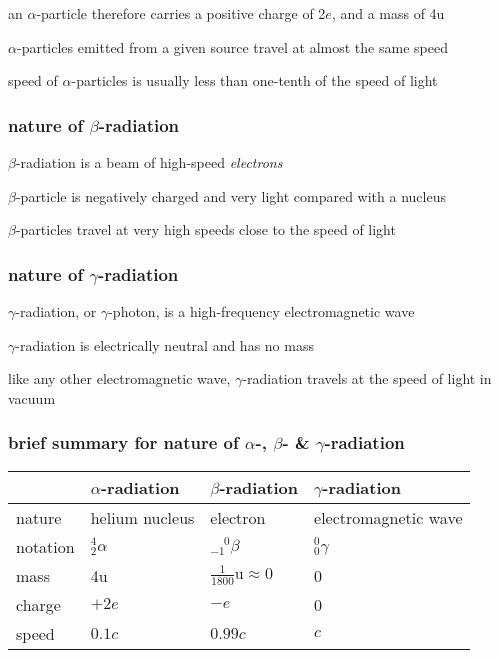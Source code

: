 an $\alpha$-particle therefore carries a positive charge of 2$e$, and a mass of 4u

$\alpha$-particles emitted from a given source travel at almost the same speed

speed of $\alpha$-particles is usually less than one-tenth of the speed of light

\subsubsection*{nature of \texorpdfstring{$\beta$}{\textbeta}-radiation}


$\beta$-radiation is a beam of high-speed \emph{electrons}

$\beta$-particle is negatively charged and very light compared with a nucleus

$\beta$-particles travel at very high speeds close to the speed of light

\subsubsection*{nature of \texorpdfstring{$\gamma$}{\textgamma}-radiation}

$\gamma$-radiation, or $\gamma$-photon, is a high-frequency electromagnetic wave

$\gamma$-radiation is electrically neutral and has no mass

like any other electromagnetic wave, $\gamma$-radiation travels at the speed of light in vacuum

\subsubsection*{brief summary for nature of \texorpdfstring{$\alpha$}{\textalpha}-, \texorpdfstring{$\beta$}{\textbeta}- \& \texorpdfstring{$\gamma$}{\textgamma}-radiation}



\begin{center}
	{\renewcommand{\arraystretch}{1.2}
	\begin{tabular}{|C{2cm}|C{2.8cm}|C{2.8cm}|C{4.2cm}|}
	\hline  & $\alpha$-radiation & $\beta$-radiation & $\gamma$-radiation \\ 
	\hline nature & helium nucleus & electron & electromagnetic wave \\ 
	\hline notation & $^4_2\alpha$ & $^{\phantom{-}0}_{-1}\beta$ & $^0_0\gamma$ \\
	\hline mass & 4u & $\frac{1}{1800}\text{u} \approx 0$ & 0 \\[4pt]
	\hline charge & $+2e$ & $-e$ & 0 \\ 
	\hline speed & $0.1c$ & $0.99c$ & $c$ \\
	\hline
    \end{tabular}
    }
\end{center}

